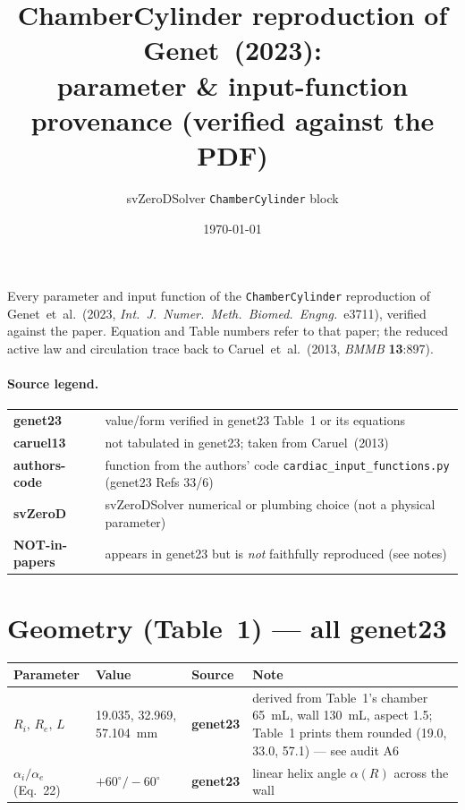 \documentclass[10pt]{article}
\title{\textbf{ChamberCylinder reproduction of Genet~(2023):\\ parameter \& input-function provenance (verified against the PDF)}}
\author{svZeroDSolver \texttt{ChamberCylinder} block}
\date{\today}
\newcommand{\gen}{\textcolor{cgen}{\textbf{genet23}}}
\newcommand{\car}{\textcolor{ccar}{\textbf{caruel13}}}
\newcommand{\code}{\textcolor{ccode}{\textbf{authors-code}}}
\newcommand{\svz}{\textcolor{csvz}{\textbf{svZeroD}}}
\newcommand{\none}{\textcolor{cnone}{\textbf{NOT-in-papers}}}
\begin{document}
\maketitle

\noindent
Every parameter and input function of the \texttt{ChamberCylinder} reproduction of
Genet~et~al.~(2023, \emph{Int.\ J.\ Numer.\ Meth.\ Biomed.\ Engng.}\ e3711), verified
against the paper. Equation and Table numbers refer to that paper; the reduced
active law and circulation trace back to Caruel~et~al.~(2013, \emph{BMMB}
\textbf{13}:897).

\paragraph{Source legend.}
\begin{tabular}{ll}
\gen & value/form verified in genet23 Table~1 or its equations \\
\car & not tabulated in genet23; taken from Caruel~(2013) \\
\code & function from the authors' code \texttt{cardiac\_input\_functions.py} (genet23 Refs 33/6) \\
\svz & svZeroDSolver numerical or plumbing choice (not a physical parameter) \\
\none & appears in genet23 but is \emph{not} faithfully reproduced (see notes) \\
\end{tabular}

\section*{Geometry (Table~1) --- all \gen}
\begin{longtable}{l l l P{6.6cm}}
\toprule Parameter & Value & Source & Note \\ \midrule\endhead
$R_i,\,R_e,\,L$ & 19.035, 32.969, \SI{57.104}{mm} & \gen & derived from Table~1's chamber \SI{65}{mL}, wall \SI{130}{mL}, aspect 1.5; Table~1 prints them rounded (19.0, 33.0, 57.1) --- see audit A6 \\
$\alpha_i/\alpha_e$ (Eq.~22) & $+60^\circ/-60^\circ$ & \gen & linear helix angle $\alpha(R)$ across the wall \\
\bottomrule
\end{longtable}

\end{document}
